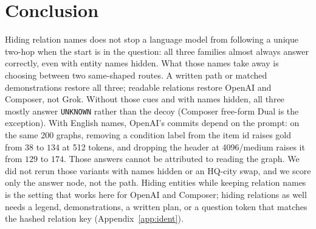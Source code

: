 \documentclass[10pt]{article} %
\begin{document}
\section{Conclusion}

Hiding relation names does not stop a language model from following a
unique two-hop when the start is in the question: all three families
almost always answer correctly, even with entity names hidden.
What those names take away is choosing between two same-shaped routes.
A written path or matched demonstrations restore all three; readable
relations restore OpenAI and Composer, not Grok.
Without those cues and with names hidden, all three mostly answer
\texttt{UNKNOWN} rather than the decoy (Composer free-form Dual is the
exception).
With English names, OpenAI's commits depend on the prompt: on the same
200 graphs, removing a condition label from the item id raises gold from
$38$ to $134$ at 512 tokens, and dropping the header at 4096/medium
raises it from $129$ to $174$.
Those answers cannot be attributed to reading the graph.
We did not rerun those variants with names hidden or an HQ-city swap, and
we score only the answer node, not the path.
Hiding entities while keeping relation names is the setting that works
here for OpenAI and Composer; hiding relations as well needs a legend,
demonstrations, a written plan, or a question token that matches the
hashed relation key (Appendix~\ref{app:ident}).
\end{document}
